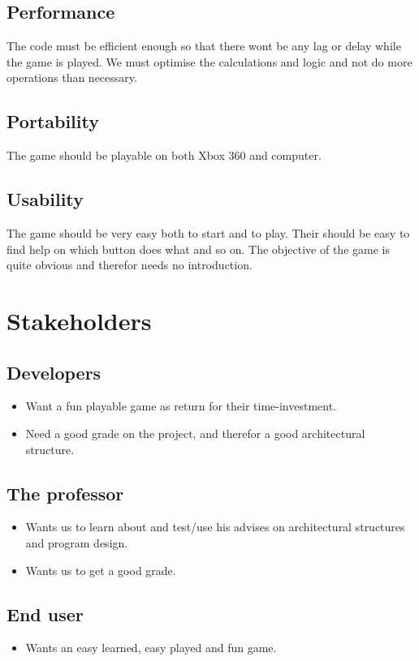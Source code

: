 \section{Performance}
The code must be efficient enough so that there wont be any lag or delay while the game is played. We must optimise the calculations and logic and not do more operations than necessary.

\section{Portability}
The game should be playable on both Xbox 360 and computer.

\section{Usability}
The game should be very easy both to start and to play. Their should be easy to find help on which button does what and so on. The objective of the game is quite obvious and therefor needs no introduction.

\chapter{Stakeholders}
\section{Developers}
\begin{itemize}
\item Want a fun playable game as return for their time-investment.
\item Need a good grade on the project, and therefor a good architectural structure.
\end{itemize}

\section{The professor}
\begin{itemize}
\item Wants us to learn about and test/use his advises on architectural structures and program design.
\item Wants us to get a good grade.
\end{itemize}

\section{End user}
\begin{itemize}
\item Wants an easy learned, easy played and fun game.
\end{itemize}

